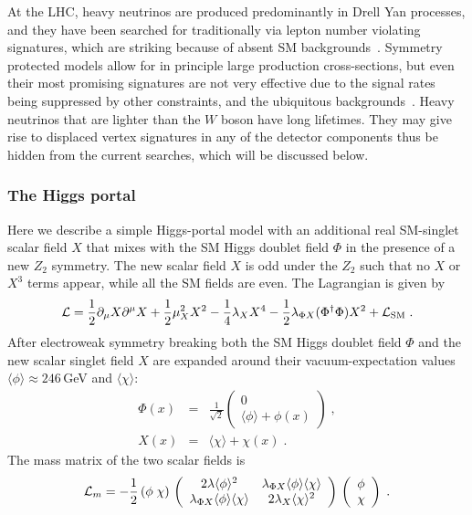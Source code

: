 \documentclass[10pt]{article}
\begin{document}
At the LHC, heavy neutrinos are produced predominantly in Drell Yan processes, and they have been searched for traditionally via lepton number violating signatures, which are striking because of absent SM backgrounds~\cite{Atre:2009rg}.
Symmetry protected models allow for in principle large production cross-sections, but even their most promising signatures are not very effective due to the signal rates being suppressed by other constraints, and the ubiquitous backgrounds~\cite{Antusch:2018bgr}.
Heavy neutrinos that are lighter than the $W$ boson have long lifetimes.
They may give rise to displaced vertex signatures in any of the detector components thus be hidden from the current searches, which will be discussed below.


\subsubsection{The Higgs portal} 
%
Here we describe a simple Higgs-portal model with an additional real SM-singlet scalar field $X$ that mixes with the SM Higgs doublet field $\Phi$ in the presence of a new $Z_2$ symmetry.
The new scalar field $X$ is odd under the $Z_2$ such that no $X$ or $X^3$ terms appear, while all the SM fields are even.  The Lagrangian is given by
%
\begin{equation}
{\cal L} = \frac{1}{2}\partial_{\mu}X\partial^{\mu}X
+\frac{1}{2}\mu^{2}_{X}X^{2}-\frac{1}{4}\lambda_{X}X^{4}
-\frac{1}{2}\lambda_{\Phi X}(\Phi^\dagger \Phi)X^{2} +  {\cal L}_\text{SM} \;. \label{L'}
\end{equation}
%
After electroweak symmetry breaking both the SM Higgs doublet field $\Phi$ and the new scalar singlet field $X$ are expanded around their vacuum-expectation values $\langle\phi\rangle\approx 246$\,GeV and $\langle\chi\rangle$:
%
\begin{eqnarray}
\Phi (x) &=& \frac{1}{\sqrt{2}} \left( \begin{array}{c}
0 \\
\langle \phi \rangle + \phi(x) \end{array} \right ) \;,  \\
X(x)    &=& \langle\chi\rangle + \chi (x) \;.
\end{eqnarray}
%
The mass matrix of the two scalar fields is 
%
\begin{equation}
{\cal L}_m =  - \frac{1}{2} \left( \phi \; \chi \right )\,
\left( \begin{array}{cc} 
2\lambda\langle\phi\rangle^2 & \lambda_{\Phi X}\langle\phi\rangle\langle\chi\rangle  \\
\lambda_{\Phi X}\langle\phi\rangle\langle\chi\rangle & 2\lambda_{X}\langle\chi\rangle^2 \end{array} \right )\,
\left( \begin{array}{c} 
\phi \\
\chi \end{array} \right ) \;.
\end{equation}
\end{document}
